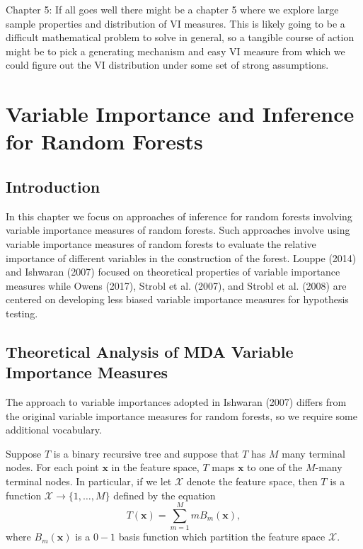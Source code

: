 \documentclass[12pt,twoside]{reedthesis}
\theoremstyle{definition}
\theoremstyle{definition}
\theoremstyle{definition}
\theoremstyle{remark}
\begin{document}
Chapter 5: If all goes well there might be a chapter 5 where we explore
large sample properties and distribution of VI measures. This is likely
going to be a difficult mathematical problem to solve in general, so a
tangible course of action might be to pick a generating mechanism and
easy VI measure from which we could figure out the VI distribution under
some set of strong assumptions.

\chapter{Variable Importance and Inference for Random
Forests}\label{variable-importance-and-inference-for-random-forests}

\section{Introduction}\label{introduction-1}

In this chapter we focus on approaches of inference for random forests
involving variable importance measures of random forests. Such
approaches involve using variable importance measures of random forests
to evaluate the relative importance of different variables in the
construction of the forest. Louppe (2014) and Ishwaran (2007) focused on
theoretical properties of variable importance measures while Owens
(2017), Strobl et al. (2007), and Strobl et al. (2008) are centered on
developing less biased variable importance measures for hypothesis
testing. \par

\section{Theoretical Analysis of MDA Variable Importance
Measures}\label{theoretical-analysis-of-mda-variable-importance-measures}

The approach to variable importances adopted in Ishwaran (2007) differs
from the original variable importance measures for random forests, so we
require some additional vocabulary. \par 

Suppose \(T\) is a binary recursive tree and suppose that \(T\) has
\(M\) many terminal nodes. For each point \(\mathbf{x}\) in the feature
space, \(T\) maps \(\mathbf{x}\) to one of the \(M\)-many terminal
nodes. In particular, if we let \(\mathcal{X}\) denote the feature
space, then \(T\) is a function
\(\mathcal{X}\rightarrow \{1,\ldots, M\}\) defined by the equation
\[T(\mathbf{x})=\sum_{m=1}^M m B_m(\mathbf{x}),\] where
\(B_m(\mathbf{x})\) is a \(0-1\) basis function which partition the
feature space \(\mathcal{X}\). \par
\end{document}
